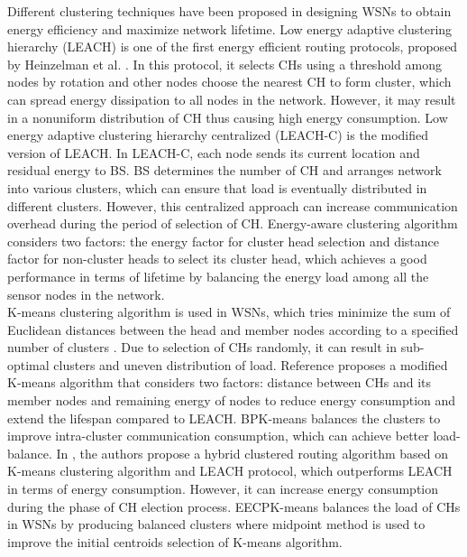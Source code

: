 \documentclass[11pt]{report}
\begin{document}
    Different clustering techniques have been proposed in designing WSNs to obtain energy efficiency and maximize network lifetime. Low energy adaptive clustering hierarchy (LEACH) is one of the first energy efficient routing protocols, proposed by Heinzelman et al. \cite{926982}. In this protocol, it selects CHs using a threshold among nodes by rotation and other nodes choose the nearest CH to form cluster, which can spread energy dissipation to all nodes in the network. However, it may result in a nonuniform distribution of CH thus causing high energy consumption. Low energy adaptive clustering hierarchy centralized (LEACH-C) \cite{1045297} is the modified version of LEACH. In LEACH-C, each node sends its current location and residual energy to BS. BS determines the number of CH and arranges network into various clusters, which can ensure that load is eventually distributed in different clusters. However, this centralized approach can increase communication overhead during the period of selection of CH. Energy-aware clustering algorithm \cite{6602412} considers two factors: the energy factor for cluster head selection and distance factor for non-cluster heads to select its cluster head, which achieves a good performance in terms of lifetime by balancing the energy load among all the sensor nodes in the network. 
	\\
	
     \noindent K-means clustering algorithm is used in WSNs, which tries minimize the sum of Euclidean distances between the head and member nodes according to a specified number of clusters \cite{6375088}. Due to selection of CHs randomly, it can result in sub-optimal clusters and uneven distribution of load. Reference \cite{randhawa2016performance} proposes a modified K-means algorithm that considers two factors: distance between CHs and its member nodes and remaining energy of nodes to reduce energy consumption and extend the lifespan compared to LEACH. BPK-means \cite{4622679} balances the clusters to improve intra-cluster communication consumption, which can achieve better load-balance. In \cite{mahboub2017energy}, the authors propose a hybrid clustered routing algorithm based on K-means clustering algorithm and LEACH protocol, which outperforms LEACH in terms of energy consumption. However, it can increase energy consumption during the phase of CH election process. EECPK-means \cite{7763028} balances the load of CHs in WSNs by producing balanced clusters where midpoint method is used to improve the initial centroids selection of K-means algorithm.
     
\end{document}
